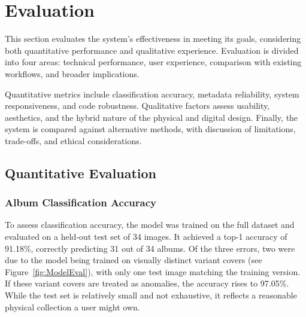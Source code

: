     
    \section{Evaluation}
    
        This section evaluates the system’s effectiveness in meeting its goals, considering both quantitative performance and qualitative experience. Evaluation is divided into four areas: technical performance, user experience, comparison with existing workflows, and broader implications.
    
        Quantitative metrics include classification accuracy, metadata reliability, system responsiveness, and code robustness. Qualitative factors assess usability, aesthetics, and the hybrid nature of the physical and digital design. Finally, the system is compared against alternative methods, with discussion of limitations, trade-offs, and ethical considerations.
        
        \subsection{Quantitative Evaluation}
    
            \subsubsection{Album Classification Accuracy}
    
                To assess classification accuracy, the model was trained on the full dataset and evaluated on a held-out test set of 34 images. It achieved a top-1 accuracy of 91.18\%, correctly predicting 31 out of 34 albums. Of the three errors, two were due to the model being trained on visually distinct variant covers (see Figure~\ref{fig:ModelEval}), with only one test image matching the training version. If these variant covers are treated as anomalies, the accuracy rises to 97.05\%. While the test set is relatively small and not exhaustive, it reflects a reasonable physical collection a user might own.
    
